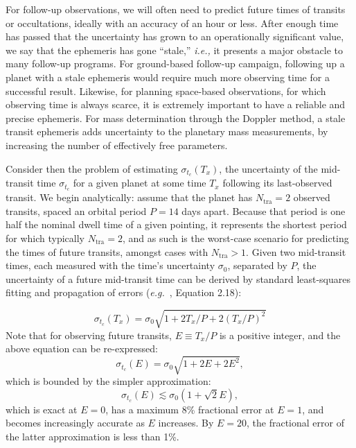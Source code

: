 For follow-up observations, we will often need to predict future times
of transits or occultations, ideally with an accuracy of an hour or
less. After enough time has passed that the uncertainty has grown to an
operationally significant value, we say that the ephemeris
has gone ``stale,'' \textit{i.e.,} it presents a major obstacle to many 
follow-up programs. For \tesss ground-based follow-up campaign, following up a 
planet
with a stale ephemeris would require much more observing time
for a successful result.  Likewise, for planning
space-based observations, for which observing time is always scarce,
it is extremely important to have a reliable and precise ephemeris.
For mass determination through the Doppler method, a stale transit
ephemeris adds uncertainty to the planetary mass measurements, by
increasing the number of effectively free parameters.

Consider then the problem of estimating $\sigma_{t_c}(T_x)$, the
uncertainty of the mid-transit time $\sigma_{t_c}$ for a given planet
at some time $T_x$ following its last-observed transit.  We begin
analytically: assume that the planet has $N_\mathrm{tra}=2$ observed
transits, spaced an orbital period $P=14$ days apart. Because that
period is one half the nominal \tess dwell time of a given pointing,
it represents the shortest period for which typically
$N_\mathrm{tra}=2$, and as such is the worst-case scenario for predicting
the times of future transits, amongst cases with $N_\mathrm{tra}>1$.
Given two mid-transit times, each measured with the time's uncertainty
$\sigma_0$, separated by $P$, the uncertainty of a future mid-transit
time can be derived by standard least-squares fitting and propagation
of errors (\textit{e.g.}~\citet{lyons_practical_1991}, Equation 2.18):

\begin{equation}
	\sigma_{t_c}(T_x) = \sigma_0 \sqrt{1 + 2 T_x / P + 2 (T_x / P)^2 }
\end{equation}
Note that for observing future transits, $E \equiv T_x / P$ is a positive 
integer, and the above equation can be re-expressed:
\begin{equation}
	\sigma_{t_c}(E) = \sigma_0 \sqrt{1 + 2 E + 2 E^2 },
\end{equation}
which is bounded by the simpler approximation: 
\begin{equation}
	\sigma_{t_c}(E) \lesssim \sigma_0 \left(1+\sqrt{2} E\right), 
\end{equation}
which is exact at $E=0$, has a maximum 8\% fractional error at $E=1$, and becomes increasingly accurate as $E$ increases. By $E=20$, the fractional error of the latter approximation is less than 1\%.

